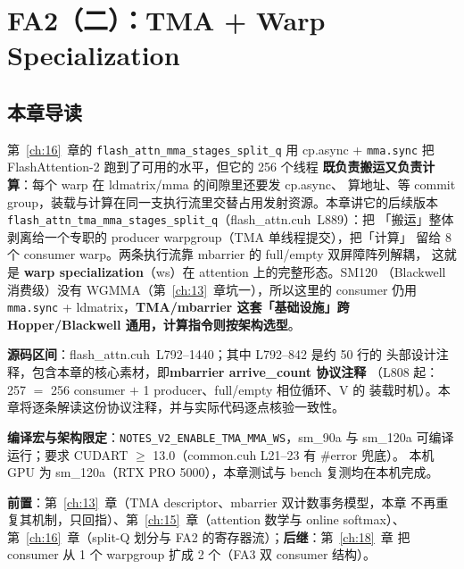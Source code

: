 \chapter{FA2（二）：TMA + Warp Specialization}\label{ch:17}

\section{本章导读}

第~\ref{ch:16}~章的 \texttt{flash\_\allowbreak{}attn\_\allowbreak{}mma\_\allowbreak{}stages\_\allowbreak{}split\_\allowbreak{}q} 用 cp.async +
\texttt{mma.sync} 把 FlashAttention-2 跑到了可用的水平，但它的 256 个线程
\textbf{既负责搬运又负责计算}：每个 warp 在 ldmatrix/mma 的间隙里还要发 cp.async、
算地址、等 commit group，装载与计算在同一支执行流里交替占用发射资源。本章讲它的后续版本
\texttt{flash\_\allowbreak{}attn\_\allowbreak{}tma\_\allowbreak{}mma\_\allowbreak{}stages\_\allowbreak{}split\_\allowbreak{}q}（flash\_attn.cuh~L889）：把
「搬运」整体剥离给一个专职的 producer warpgroup（TMA 单线程提交），把「计算」
留给 8 个 consumer warp。两条执行流靠 mbarrier 的 full/empty 双屏障阵列解耦，
这就是 \textbf{warp specialization}（ws）在 attention 上的完整形态。SM120
（Blackwell 消费级）没有 WGMMA（第~\ref{ch:13}~章坑一），所以这里的 consumer
仍用 \texttt{mma.sync} + ldmatrix，\textbf{TMA/mbarrier 这套「基础设施」跨
Hopper/Blackwell 通用，计算指令则按架构选型}。

\textbf{源码区间}：flash\_attn.cuh~L792--1440；其中 L792--842 是约 50 行的
头部设计注释，包含本章的核心素材，即\textbf{mbarrier arrive\_count 协议注释}
（L808 起：257 $=$ 256 consumer $+$ 1 producer、full/empty 相位循环、V 的
装载时机）。本章将逐条解读这份协议注释，并与实际代码逐点核验一致性。

\textbf{编译宏与架构限定}：\texttt{NOTES\_\allowbreak{}V2\_\allowbreak{}ENABLE\_\allowbreak{}TMA\_\allowbreak{}MMA\_\allowbreak{}WS}，sm\_90a 与
sm\_120a 可编译运行；要求 CUDART $\ge$ 13.0（common.cuh L21--23 有 \#error 兜底）。
本机 GPU 为 sm\_120a（RTX PRO 5000），本章测试与 bench 复测均在本机完成。

\textbf{前置}：第~\ref{ch:13}~章（TMA descriptor、mbarrier 双计数事务模型，本章
不再重复其机制，只回指）、第~\ref{ch:15}~章（attention 数学与 online softmax）、
第~\ref{ch:16}~章（split-Q 划分与 FA2 的寄存器流）；\textbf{后继}：第~\ref{ch:18}~章
把 consumer 从 1 个 warpgroup 扩成 2 个（FA3 双 consumer 结构）。

